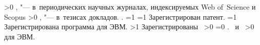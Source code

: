 {\begin{refsection}
        \ifnum \value{citeauthorscopuswos}>0%
            ,  "--- в~периодических научных журналах, индексируемых Web of~Science и Scopus%
        \fi%
        \ifnum \value{citeauthorconf}>0%
            ,  "--- в~тезисах докладов.
        \else%
            .
        \fi%
        \ifnum \value{citeregistered}=1%
            \ifnum \value{citeauthorpatent}=1%
                Зарегистрирован  патент.
            \fi%
            \ifnum \value{citeauthorprogram}=1%
                Зарегистрирована  программа для ЭВМ.
            \fi%
        \fi%
        \ifnum \value{citeregistered}>1%
            Зарегистрированы\ %
            \ifnum \value{citeauthorpatent}>0%
            \ifnum \value{citeauthorprogram}=0 . \else \ и~\fi%
            \fi%
            \ifnum \value{citeauthorprogram}>0%
             для ЭВМ.
            \fi%
        \fi%
    \end{refsection}%
    \begin{refsection}
        \nocite{vakbib2}%
        \nocite{patbib1}%
        \nocite{progbib1}%
        \nocite{bib1}%
        \nocite{confbib1}%
    \end{refsection}%
}

